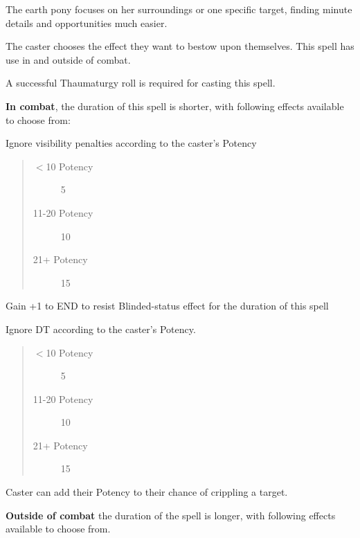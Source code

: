 \documentclass[11pt,a4paper,twocolumn]{book}
\begin{document}
\medskip

The earth pony focuses on her surroundings or one specific target, finding minute details and opportunities much easier.

The caster chooses the effect they want to bestow upon themselves. This spell has use in and outside of combat.

A successful Thaumaturgy roll is required for casting this spell.

\medskip

\textbf{In combat}, the duration of this spell is shorter, with following effects available to choose from:

\medskip

\begin{compactitem}
	\item Ignore visibility penalties according to the caster's Potency
	\begin{quote}
		\begin{description}
			\item[$<$10 Potency] 	5
			\item[11-20 Potency] 	10
			\item[21+ Potency] 	15
		\end{description}
	\end{quote}
	\item Gain +1 to END to resist Blinded-status effect for the duration of this spell
	\item Ignore DT according to the caster's Potency.
	\begin{quote}
		\begin{description}
			\item[$<$10 Potency] 	5
			\item[11-20 Potency] 	10
			\item[21+ Potency] 	15
		\end{description}
	\end{quote}
	\item Caster can add their Potency to their chance of crippling a target.
\end{compactitem}

\vfill

\textbf{Outside of combat} the duration of the spell is longer, with following effects available to choose from.

\medskip
\end{document}
